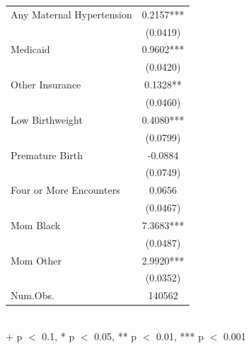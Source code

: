 \begin{table}[ht]
\begin{tabular}{l c}
Any Maternal Hypertension                  & 0.2157***  \\
                                           & (0.0419)   \\
Medicaid                                   & 0.9602***  \\
                                           & (0.0420)   \\
Other Insurance                            & 0.1328**   \\
                                           & (0.0460)   \\
Low Birthweight                            & 0.4080***  \\
                                           & (0.0799)   \\
Premature Birth                            & -0.0884    \\
                                           & (0.0749)   \\
Four or More Encounters                    & 0.0656     \\
                                           & (0.0467)   \\
Mom Black                                  & 7.3683***  \\
                                           & (0.0487)   \\
Mom Other                                  & 2.9920***  \\
                                           & (0.0352)   \\
Num.Obs.                                   & 140562     \\ \bottomrule
\end{tabular}
\small
\\
\noindent + p $<$ 0.1, * p $<$ 0.05, ** p $<$ 0.01, *** p $<$ 0.001
\label{propensity_model}
\end{table}
